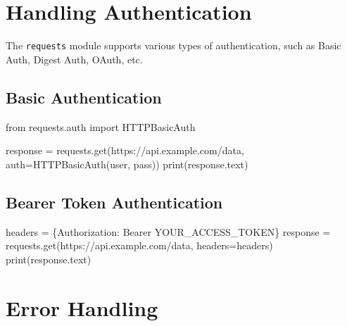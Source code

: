 \documentclass[
  letterpaper,
  DIV=11,
  numbers=noendperiod]{scrreprt}
\newenvironment{Shaded}{\begin{snugshade}}{\end{snugshade}}
\newcommand{\BuiltInTok}[1]{\textcolor[rgb]{0.00,0.23,0.31}{#1}}
\newcommand{\ImportTok}[1]{\textcolor[rgb]{0.00,0.46,0.62}{#1}}
\newcommand{\NormalTok}[1]{\textcolor[rgb]{0.00,0.23,0.31}{#1}}
\newcommand{\OperatorTok}[1]{\textcolor[rgb]{0.37,0.37,0.37}{#1}}
\newcommand{\StringTok}[1]{\textcolor[rgb]{0.13,0.47,0.30}{#1}}
\begin{document}
\section{Handling Authentication}\label{handling-authentication}

The \texttt{requests} module supports various types of authentication,
such as Basic Auth, Digest Auth, OAuth, etc.

\subsection{Basic Authentication}\label{basic-authentication}

\begin{Shaded}
\begin{Highlighting}[]
\ImportTok{from}\NormalTok{ requests.auth }\ImportTok{import}\NormalTok{ HTTPBasicAuth}

\NormalTok{response }\OperatorTok{=}\NormalTok{ requests.get(}\StringTok{\textquotesingle{}https://api.example.com/data\textquotesingle{}}\NormalTok{, auth}\OperatorTok{=}\NormalTok{HTTPBasicAuth(}\StringTok{\textquotesingle{}user\textquotesingle{}}\NormalTok{, }\StringTok{\textquotesingle{}pass\textquotesingle{}}\NormalTok{))}
\BuiltInTok{print}\NormalTok{(response.text)}
\end{Highlighting}
\end{Shaded}

\subsection{Bearer Token
Authentication}\label{bearer-token-authentication}

\begin{Shaded}
\begin{Highlighting}[]
\NormalTok{headers }\OperatorTok{=}\NormalTok{ \{}\StringTok{\textquotesingle{}Authorization\textquotesingle{}}\NormalTok{: }\StringTok{\textquotesingle{}Bearer YOUR\_ACCESS\_TOKEN\textquotesingle{}}\NormalTok{\}}
\NormalTok{response }\OperatorTok{=}\NormalTok{ requests.get(}\StringTok{\textquotesingle{}https://api.example.com/data\textquotesingle{}}\NormalTok{, headers}\OperatorTok{=}\NormalTok{headers)}
\BuiltInTok{print}\NormalTok{(response.text)}
\end{Highlighting}
\end{Shaded}

\section{Error Handling}\label{error-handling-1}
\end{document}
